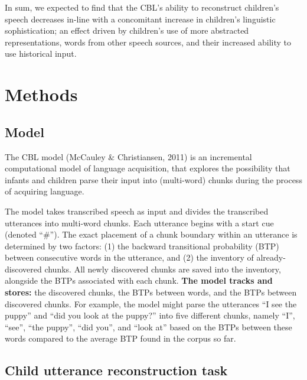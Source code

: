 \documentclass[man,mask,floatsintext]{apa6}
\begin{document}
In sum, we expected to find that the CBL's ability to reconstruct
children's speech decreases in-line with a concomitant increase in
children's linguistic sophistication; an effect driven by children's use
of more abstracted representations, words from other speech sources, and
their increased ability to use historical input.

\section{Methods}\label{methods}

\subsection{Model}\label{model}

The CBL model (McCauley \& Christiansen, 2011) is an incremental
computational model of language acquisition, that explores the
possibility that infants and children parse their input into
(multi-word) chunks during the process of acquiring language.

The model takes transcribed speech as input and divides the transcribed
utterances into multi-word chunks. Each utterance begins with a start
cue (denoted \enquote{\#}). The exact placement of a chunk boundary
within an utterance is determined by two factors: (1) the backward
transitional probability (BTP) between consecutive words in the
utterance, and (2) the inventory of already-discovered chunks. All newly
discovered chunks are saved into the inventory, alongside the BTPs
associated with each chunk. \textbf{The model tracks and stores:} the
discovered chunks, the BTPs between words, and the BTPs between
discovered chunks. For example, the model might parse the utterances
\enquote{I see the puppy} and \enquote{did you look at the puppy?} into
five different chunks, namely \enquote{I}, \enquote{see}, \enquote{the
puppy}, \enquote{did you}, and \enquote{look at} based on the BTPs
between these words compared to the average BTP found in the corpus so
far.

\subsection{Child utterance reconstruction
task}\label{child-utterance-reconstruction-task}
\end{document}
